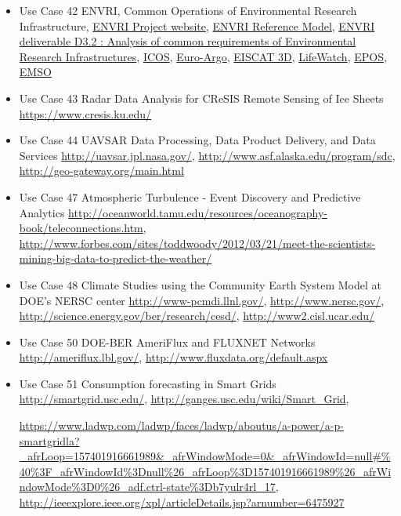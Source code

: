 \begin{itemize}
\item
  Use Case 42 ENVRI, Common Operations of Environmental Research
  Infrastructure, 
  \href{http://envri.eu/}{ENVRI Project website},
  \href{http://confluence.envri.eu:8090/display/ERM/Start}{ENVRI  Reference Model},
  \href{http://confluence.envri.eu:8090/download/attachments/327687/D3.3\%20Analysis\%20of\%20Requirements\%20V1.0.pdf?version=1\&modificationDate=1366965933706\&api=v2}{ENVRI
    deliverable D3.2 : Analysis of common requirements of
    Environmental  Research Infrastructures}, 
\href{https://www.icos-ri.eu/}{ICOS},
  \href{http://www.euro-argo.eu/}{Euro-Argo},
  \href{https://www.eiscat3d.se/node}{EISCAT 3D},
  \href{http://www.lifewatch.com/}{LifeWatch},
  \href{http://www.epos-eu.org/}{EPOS},
  \href{http://www.emso-eu.org/}{EMSO}

\item
  Use Case 43 Radar Data Analysis for CReSIS Remote Sensing of Ice
  Sheets \url{https://www.cresis.ku.edu/}
\item
  Use Case 44 UAVSAR Data Processing, Data Product Delivery, and Data
  Services
  \url{http://uavsar.jpl.nasa.gov/}, \url{http://www.asf.alaska.edu/program/sdc}, \url{http://geo-gateway.org/main.html}
\item
  Use Case 47 Atmospheric Turbulence - Event Discovery and Predictive
  Analytics
  \url{http://oceanworld.tamu.edu/resources/oceanography-book/teleconnections.htm},
  \url{http://www.forbes.com/sites/toddwoody/2012/03/21/meet-the-scientists-mining-big-data-to-predict-the-weather/}
\item
  Use Case 48 Climate Studies using the Community Earth System Model at
  DOE's NERSC center
  \url{http://www-pcmdi.llnl.gov/}, 
  \url{http://www.nersc.gov/}, 
  \url{http://science.energy.gov/ber/research/cesd/}, 
  \url{http://www2.cisl.ucar.edu/}

\item
  Use Case 50 DOE-BER AmeriFlux and FLUXNET Networks
  \url{http://ameriflux.lbl.gov/},
  \url{http://www.fluxdata.org/default.aspx}
\item
  Use Case 51 Consumption forecasting in Smart Grids
  \url{http://smartgrid.usc.edu/},
  \url{http://ganges.usc.edu/wiki/Smart_Grid},

  \url{https://www.ladwp.com/ladwp/faces/ladwp/aboutus/a-power/a-p-smartgridla?_afrLoop=157401916661989\&_afrWindowMode=0\&_afrWindowId=null\#\%40\%3F_afrWindowId\%3Dnull\%26_afrLoop\%3D157401916661989\%26_afrWindowMode\%3D0\%26_adf.ctrl-state\%3Db7yulr4rl_17},
  \url{http://ieeexplore.ieee.org/xpl/articleDetails.jsp?arnumber=6475927}


\end{itemize}
